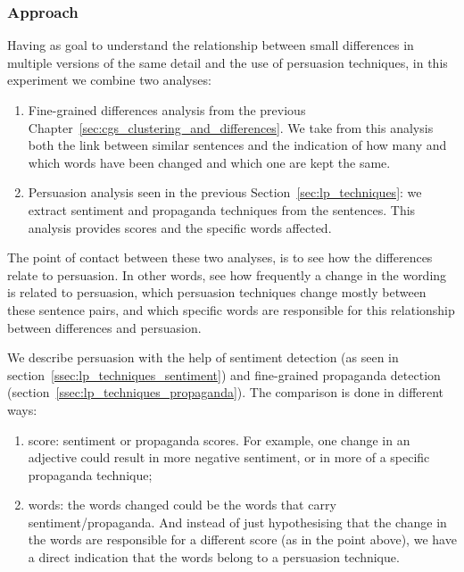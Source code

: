 \subsubsection{Approach}
\label{ssec:lp_relationship_small_variations_appr}

Having as goal to understand the relationship between small differences in multiple versions of the same detail and the use of persuasion techniques, in this experiment we combine two analyses:
\begin{enumerate}
    \item Fine-grained differences analysis from the previous Chapter~\ref{sec:cgs_clustering_and_differences}. We take from this analysis both the link between similar sentences and the indication of how many and which words have been changed and which one are kept the same.
    \item Persuasion analysis seen in the previous Section~\ref{sec:lp_techniques}: we extract sentiment and propaganda techniques from the sentences. This analysis provides scores and the specific words affected.
\end{enumerate}

The point of contact between these two analyses, is to see how the differences relate to persuasion. In other words, see how frequently a change in the wording is related to persuasion, which persuasion techniques change mostly between these sentence pairs, and which specific words are responsible for this relationship between differences and persuasion.

We describe persuasion with the help of sentiment detection (as seen in section~\ref{ssec:lp_techniques_sentiment}) and fine-grained propaganda detection (section~\ref{ssec:lp_techniques_propaganda}).
The comparison is done in different ways:
\begin{enumerate}
    \item score: sentiment or propaganda scores. For example, one change in an adjective could result in more negative sentiment, or in more of a specific propaganda technique;
    \item words: the words changed could be the words that carry sentiment/propaganda. And instead of just hypothesising that the change in the words are responsible for a different score (as in the point above), we have a direct indication that the words belong to a persuasion technique.
\end{enumerate}

